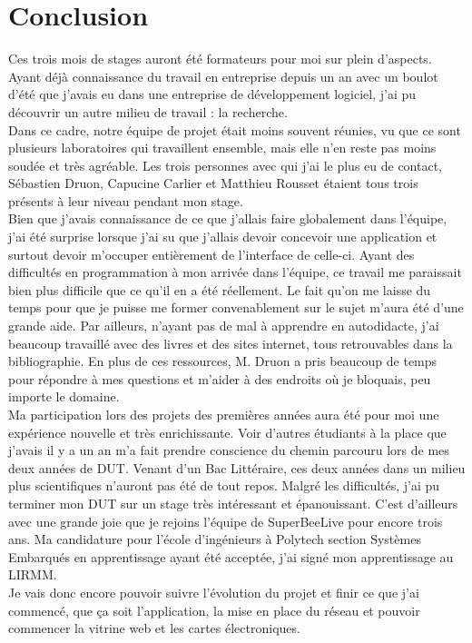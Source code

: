 \documentclass[11pt,french,a4paper]{report}
\begin{document}
\chapter{Conclusion}
Ces trois mois de stages auront été formateurs pour moi sur plein d'aspects. Ayant déjà connaissance du travail en entreprise depuis un an
avec un boulot d'été que j'avais eu dans une entreprise de développement logiciel, j'ai pu découvrir un autre milieu de travail : 
la recherche. \\
Dans ce cadre, notre équipe de projet était moins souvent réunies, vu que ce sont plusieurs laboratoires qui travaillent ensemble, 
mais elle n'en reste pas moins soudée et très agréable. Les trois personnes avec qui j'ai le plus eu de contact, Sébastien Druon, 
Capucine Carlier et Matthieu Rousset étaient tous trois présents à leur niveau pendant mon stage.  \\
Bien que j'avais connaissance de ce que j'allais faire globalement dans l'équipe, j'ai été surprise lorsque j'ai su que j'allais
devoir concevoir une application et surtout devoir m'occuper entièrement de l'interface de celle-ci. 
Ayant des difficultés en programmation à mon arrivée dans l'équipe, ce travail me paraissait bien plus difficile que ce qu'il 
en a été réellement. Le fait qu'on me laisse du temps pour que je puisse me former convenablement sur le sujet m'aura été 
d'une grande aide. Par ailleurs, n'ayant pas de mal à apprendre en autodidacte, j'ai beaucoup travaillé avec des livres et
des sites internet, tous retrouvables dans la bibliographie. En plus de ces ressources, M. Druon a pris beaucoup de temps
pour répondre à mes questions et m'aider à des endroits où je bloquais, peu importe le domaine. \\

Ma participation lors des projets des premières années aura été pour moi une expérience nouvelle et très enrichissante. Voir
d'autres étudiants à la place que j'avais il y a un an m'a fait prendre conscience du chemin parcouru lors de mes deux années de DUT. 
Venant d'un Bac Littéraire, ces deux années dans un milieu plus scientifiques n'auront pas été de tout repos. Malgré les difficultés, 
j'ai pu terminer mon DUT sur un stage très intéressant et épanouissant.
C'est d'ailleurs avec une grande joie que je rejoins l'équipe de SuperBeeLive pour encore trois ans. Ma candidature pour l'école d'ingénieurs
à Polytech section Systèmes Embarqués en apprentissage ayant été acceptée, j'ai signé mon apprentissage au LIRMM. \\
Je vais donc encore pouvoir suivre l'évolution du projet et finir ce que j'ai commencé, que ça soit l'application, la mise en place du 
réseau et pouvoir commencer la vitrine web et les cartes électroniques.  \\
\end{document}

